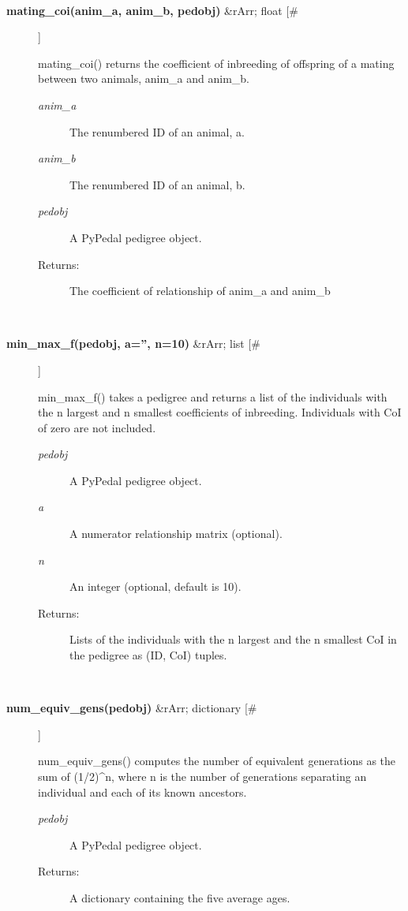 \begin{description}
\begin{description}
\end{description}
\\ 

\item[\textbf{mating\_coi(anim\_a, anim\_b, pedobj)}
 \&rArr; float [\#]]

 mating\_coi() returns the coefficient of inbreeding of offspring of a mating between two animals, anim\_a and anim\_b.
\begin{description}
\item[\emph{anim\_a}
] The renumbered ID of an animal, a.
\item[\emph{anim\_b}
] The renumbered ID of an animal, b.
\item[\emph{pedobj}
] A PyPedal pedigree object.
\item[Returns:] The coefficient of relationship of anim\_a and anim\_b

\end{description}
\\ 

\item[\textbf{min\_max\_f(pedobj, a='', n=10)}
 \&rArr; list [\#]]

 min\_max\_f() takes a pedigree and returns a list of the individuals with the n largest and n smallest coefficients of inbreeding. Individuals with CoI of zero are not included.
\begin{description}
\item[\emph{pedobj}
] A PyPedal pedigree object.
\item[\emph{a}
] A numerator relationship matrix (optional).
\item[\emph{n}
] An integer (optional, default is 10).
\item[Returns:] Lists of the individuals with the n largest and the n smallest CoI in the pedigree as (ID, CoI) tuples.

\end{description}
\\ 

\item[\textbf{num\_equiv\_gens(pedobj)}
 \&rArr; dictionary [\#]]

 num\_equiv\_gens() computes the number of equivalent generations as the sum of (1/2)\^{}n, where n is the number of generations separating an individual and each of its known ancestors.
\begin{description}
\item[\emph{pedobj}
] A PyPedal pedigree object.
\item[Returns:] A dictionary containing the five average ages.


\end{description}
\end{description}
